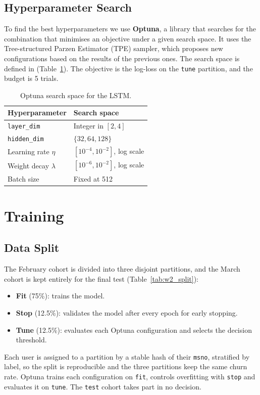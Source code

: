 \documentclass{article}
\begin{document}
\subsection{Hyperparameter Search}

To find the best hyperparameters we use \textbf{Optuna}, a library that searches for the combination that minimises an objective under a given search space. It uses the Tree-structured Parzen Estimator (TPE) sampler, which proposes new configurations based on the results of the previous ones. The search space is defined in  (Table~\ref{tab:w2_space}). The objective is the log-loss on the \texttt{tune} partition, and the budget is 5 trials.

\begin{table}[H]
\centering
\renewcommand{\arraystretch}{1.3}
\begin{tabular}{|l|l|}
\hline
\textbf{Hyperparameter} & \textbf{Search space} \\ \hline
\texttt{layer\_dim}    & Integer in $[2, 4]$ \\ \hline
\texttt{hidden\_dim}   & $\{32, 64, 128\}$ \\ \hline
Learning rate $\eta$   & $[10^{-4}, 10^{-2}]$, log scale \\ \hline
Weight decay $\lambda$ & $[10^{-6}, 10^{-2}]$, log scale \\ \hline
Batch size             & Fixed at 512 \\ \hline
\end{tabular}
\caption{Optuna search space for the LSTM.}
\label{tab:w2_space}
\end{table}

\section{Training}

\subsection{Data Split}

The February cohort is divided into three disjoint partitions, and the March cohort is kept entirely for the final test (Table~\ref{tab:w2_split}):
\begin{itemize}
    \item \textbf{Fit} (75\%): trains the model.
    \item \textbf{Stop} (12.5\%): validates the model after every epoch for early stopping.
    \item \textbf{Tune} (12.5\%): evaluates each Optuna configuration and selects the decision threshold.
\end{itemize}
Each user is assigned to a partition by a stable hash of their \texttt{msno}, stratified by label, so the split is reproducible and the three partitions keep the same churn rate. Optuna trains each configuration on \texttt{fit}, controls overfitting with \texttt{stop} and evaluates it on \texttt{tune}. The \texttt{test} cohort takes part in no decision.
\end{document}
